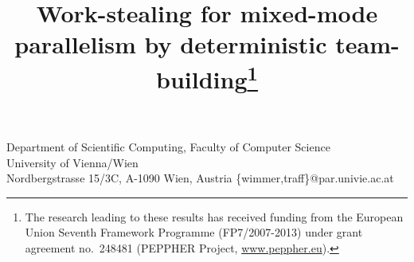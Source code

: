 \documentclass[preprint]{sigplanconf}
\begin{document}
\title{Work-stealing for mixed-mode parallelism by
deterministic team-building\thanks{The 
research leading to these results has received funding from the 
European Union Seventh Framework Programme (FP7/2007-2013)
under grant agreement no.\ 248481 (PEPPHER Project, \protect\url{www.peppher.eu}).}}
{Department of Scientific Computing, Faculty of Computer Science \\
University of Vienna/Wien\\
Nordbergstrasse 15/3C, A-1090 Wien, Austria}
{\{wimmer,traff\}@par.univie.ac.at}

\maketitle
\end{document}
